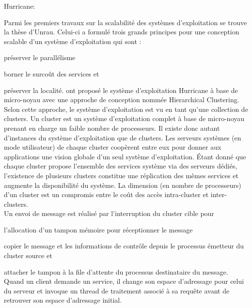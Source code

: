       \begin{paragraph}{Hurricane:}

        Parmi les premiers travaux sur la scalabilité des systèmes
        d’exploitation se trouve la thèse d’Unrau. Celui-ci a formulé trois
        grands principes pour une conception scalable d’un système
        d’exploitation qui sont : \benumline \item préserver le
        parallélisme \item borner le surcoût des services et \item préserver la
        localité\eenumline. \citet{unrau1995hierarchical} ont proposé le système
        d’exploitation Hurricane à base de micro-noyau avec une approche de
        conception nommée Hierarchical Clustering.\\

        Selon cette approche, le système d’exploitation est vu en tant qu’une
        collection de clusters. Un cluster est un système d’exploitation complet
        à base de micro-noyau prenant en charge un faible nombre de
        processeurs. Il existe donc autant d’instances du système d’exploitation
        que de clusters. Les serveurs systèmes (en mode utilisateur) de chaque
        cluster coopèrent entre eux pour donner aux applications une vision
        globale d’un seul système d’exploitation. Étant donné que chaque cluster
        propose l’ensemble des services système via des serveurs dédiés,
        l’existence de plusieurs clusters constitue une réplication des mêmes
        services et augmente la disponibilité du système. La dimension (en
        nombre de processeurs) d’un cluster est un compromis entre le coût des
        accès intra-cluster et inter-clusters.\\

        Un envoi de message est réalisé par l’interruption du cluster cible
        pour\benumline \item l’allocation d’un tampon mémoire pour réceptionner
        le message \item copier le message et les informations de contrôle
        depuis le processus émetteur du cluster source et \item attacher le
        tampon à la file d’attente du processus destinataire du
        message\eenumline. Quand un client demande un service, il change son
        espace d’adressage pour celui du serveur et invoque un thread de
        traitement associé à sa requête avant de retrouver son espace
        d’adressage initial.

      \end{paragraph}
      
